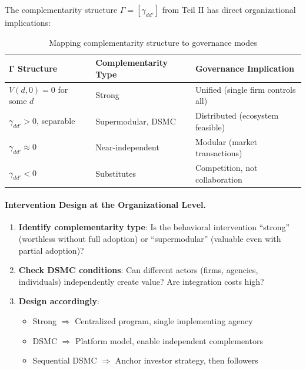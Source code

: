 The complementarity structure $\Gamma = [\gamma_{dd'}]$ from Teil II has direct 
organizational implications:

\begin{table}[h]
\centering
\small
\begin{tabular}{p{3.5cm}p{4cm}p{5cm}}
\toprule
\textbf{Γ Structure} & \textbf{Complementarity Type} & \textbf{Governance Implication} \\
\midrule
$V(d, 0) = 0$ for some $d$ & Strong & Unified (single firm controls all) \\
$\gamma_{dd'} > 0$, separable & Supermodular, DSMC & Distributed (ecosystem feasible) \\
$\gamma_{dd'} \approx 0$ & Near-independent & Modular (market transactions) \\
$\gamma_{dd'} < 0$ & Substitutes & Competition, not collaboration \\
\bottomrule
\end{tabular}
\caption{Mapping complementarity structure to governance modes}
\label{tab:gamma-governance}
\end{table}

\paragraph{Intervention Design at the Organizational Level.}

\begin{enumerate}
    \item \textbf{Identify complementarity type}: Is the behavioral intervention 
    ``strong'' (worthless without full adoption) or ``supermodular'' (valuable 
    even with partial adoption)?
    
    \item \textbf{Check DSMC conditions}: Can different actors (firms, agencies, 
    individuals) independently create value? Are integration costs high?
    
    \item \textbf{Design accordingly}:
    \begin{itemize}
        \item Strong $\Rightarrow$ Centralized program, single implementing agency
        \item DSMC $\Rightarrow$ Platform model, enable independent complementors
        \item Sequential DSMC $\Rightarrow$ Anchor investor strategy, then followers
    \end{itemize}
\end{enumerate}

